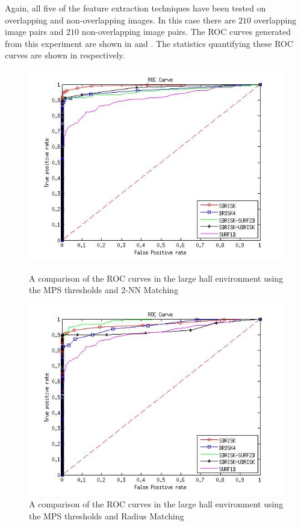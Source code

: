 \documentclass[11pt]{report}
\begin{document}
Again, all five of the feature extraction techniques have been tested on overlapping and non-overlapping images. In this case there are $210$ overlapping image pairs and $210$ non-overlapping image pairs. The ROC curves generated from this experiment are shown in  and . The statistics quantifying these ROC curves are shown in  respectively.\\

\begin{figure}[h!]
\begin{minipage}[b]{0.5\linewidth}
\includegraphics[scale=0.4]{../Drawings/dataset3_ROC_General_KNN.jpg}
\caption{A comparison of the ROC curves in the large hall environment using the MPS thresholds and 2-NN Matching}
\label{fig:compareKnnOffice3}
\end{minipage}
\hspace{0.5cm}
\begin{minipage}[b]{0.5\linewidth}
\includegraphics[scale=0.4]{../Drawings/dataset3_ROC_General_Hamming.jpg}
\caption{A comparison of the ROC curves in the large hall environment using the MPS thresholds and Radius Matching}
\label{fig:compareHammingOffice3}
\end{minipage}
\end{figure}
\end{document}
